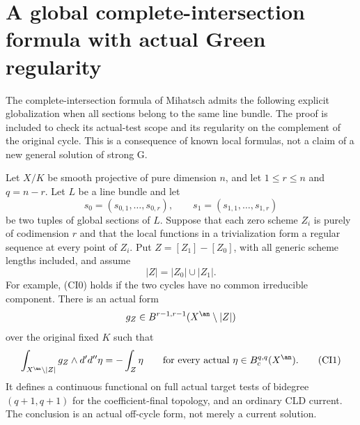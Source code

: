 \section{A global complete-intersection formula with actual Green regularity}
\label{sec:global-complete-intersection-green}

The complete-intersection formula of Mihatsch admits the following
explicit globalization when all sections belong to the same line bundle.
The proof is included to check its actual-test scope and its regularity
on the complement of the original cycle.  This is a consequence of known
local formulas, not a claim of a new general solution of strong G.

\begin{proposition}
\label{prop:global-complete-intersection-strong-green}
Let $X/K$ be smooth projective of pure dimension $n$, and let
$1\le r\le n$ and $q=n-r$.  Let $L$ be a line bundle and let
\[
 s_0=(s_{0,1},\ldots,s_{0,r}),\qquad
 s_1=(s_{1,1},\ldots,s_{1,r})
\]
be two tuples of global sections of $L$.  Suppose that each zero scheme $Z_i$ is purely of codimension $r$
and that the local functions in a trivialization form a regular
sequence at every point of $Z_i$.  Put
$Z=[Z_1]-[Z_0]$, with all generic scheme lengths included, and assume
\[
             |Z|=|Z_0|\cup|Z_1|.                    \tag{CI0}
\]
For example, (CI0) holds if the two cycles have no common irreducible
component.  There is an actual form
\[
       g_Z\in B^{r-1,r-1}(X^{\an}\setminus|Z|)
\]
over the original fixed $K$ such that
\[
       \int_{X^{\an}\setminus|Z|}g_Z\wedge d'd''\eta
                             =-\int_Z\eta
       \qquad\text{for every actual }\eta\in B_c^{q,q}(X^{\an}).
                                                        \tag{CI1}
\]
It defines a continuous functional on full actual target tests of
bidegree $(q+1,q+1)$ for the coefficient-final topology, and an
ordinary CLD current.  The conclusion is an actual off-cycle form,
not merely a current solution.
\end{proposition}

